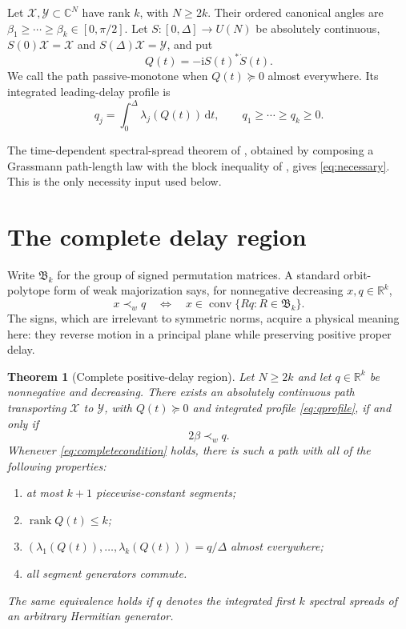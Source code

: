 \documentclass[11pt]{article}
\newtheorem{theorem}{Theorem}[section]
\theoremstyle{definition}
\theoremstyle{remark}
\newcommand{\C}{\mathbb C}
\newcommand{\rank}{\operatorname{rank}}
\newcommand{\dd}{\mathrm d}
\begin{document}
Let $\mathcal X,\mathcal Y\subset\C^N$ have rank $k$, with $N\geq2k$.
Their ordered canonical angles are
$\beta_1\geq\cdots\geq\beta_k\in[0,\pi/2]$.
Let $S:[0,\Delta]\to U(N)$ be absolutely continuous,
$S(0)\mathcal X=\mathcal X$ and $S(\Delta)\mathcal X=\mathcal Y$, and put
\begin{equation}\label{eq:generator}
 Q(t)=-\mathrm iS(t)^*\dot S(t).
\end{equation}
We call the path passive-monotone when $Q(t)\succeq0$ almost everywhere.
Its integrated leading-delay profile is
\begin{equation}\label{eq:qprofile}
 q_j=\int_0^\Delta\lambda_j(Q(t))\,\dd t,
 \qquad q_1\geq\cdots\geq q_k\geq0.
\end{equation}

The time-dependent spectral-spread theorem of
\cite{ErikssonKyFan2026}, obtained by composing a Grassmann path-length law
with the block inequality of \cite{MasseyStojanoffZarate2021}, gives
\eqref{eq:necessary}.  This is the only necessity input used below.

\section{The complete delay region}

Write $\mathfrak B_k$ for the group of signed permutation matrices.  A
standard orbit-polytope form of weak majorization says, for nonnegative
decreasing $x,q\in\mathbb R^k$,
\begin{equation}\label{eq:signedpolytope}
 x\prec_wq
 \quad\Longleftrightarrow\quad
 x\in\operatorname{conv}\{Rq:R\in\mathfrak B_k\}.
\end{equation}
The signs, which are irrelevant to symmetric norms, acquire a physical
meaning here: they reverse motion in a principal plane while preserving
positive proper delay.

\begin{theorem}[Complete positive-delay region]\label{thm:complete}
Let $N\geq2k$ and let $q\in\mathbb R^k$ be nonnegative and decreasing.
There exists an absolutely continuous path transporting $\mathcal X$ to
$\mathcal Y$, with $Q(t)\succeq0$ and integrated profile \eqref{eq:qprofile},
if and only if
\begin{equation}\label{eq:completecondition}
 2\beta\prec_wq.
\end{equation}
Whenever \eqref{eq:completecondition} holds, there is such a path with all of
the following properties:
\begin{enumerate}
 \item at most $k+1$ piecewise-constant segments;
 \item $\rank Q(t)\leq k$;
 \item $(\lambda_1(Q(t)),\ldots,\lambda_k(Q(t)))=q/\Delta$ almost everywhere;
 \item all segment generators commute.
\end{enumerate}
The same equivalence holds if $q$ denotes the integrated first $k$ spectral
spreads of an arbitrary Hermitian generator.
\end{theorem}
\end{document}
